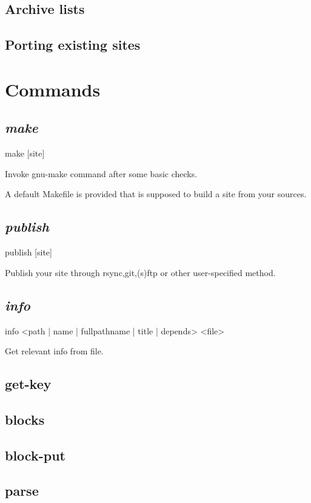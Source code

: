 \documentclass{memoir}
\begin{document}

	\section{Archive lists} %


	\section{Porting existing sites} %



\chapter{Commands} %

	\section{\emph{make}} %
	make [site]

	Invoke gnu-make command after some basic checks.

	A default Makefile is provided that is supposed to build a site from your sources.
	\section{\emph{publish}} %
	publish [site]

	Publish your site through rsync,git,(s)ftp or other user-specified method.
	\section{\emph{info}}
	info <path | name | fullpathname | title | depends> <file>

	Get relevant info from file.
	\section{get-key}
	\section{blocks}
	\section{block-put}
	\section{parse}
\end{document}
